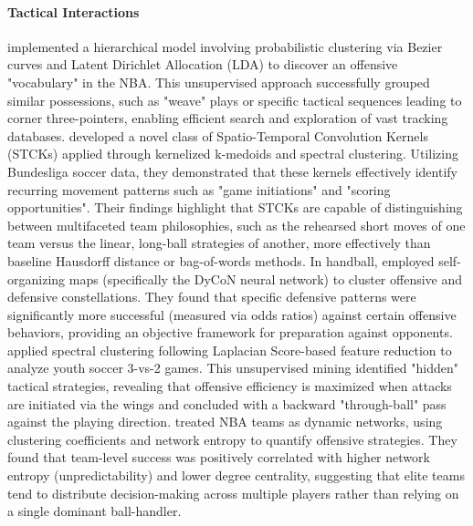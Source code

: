 \paragraph{Tactical Interactions}
\cite{Miller2017possession} implemented a hierarchical model involving probabilistic clustering via Bezier curves and Latent Dirichlet Allocation (LDA) to discover an offensive "vocabulary" in the NBA. 
This unsupervised approach successfully grouped similar possessions, such as "weave" plays or specific tactical sequences leading to corner three-pointers, enabling efficient search and exploration of vast tracking databases.
\cite{Knauf2015SpatiotemporalCK} developed a novel class of Spatio-Temporal Convolution Kernels (STCKs) applied through kernelized k-medoids and spectral clustering. 
Utilizing Bundesliga soccer data, they demonstrated that these kernels effectively identify recurring movement patterns such as "game initiations" and "scoring opportunities". 
Their findings highlight that STCKs are capable of distinguishing between multifaceted team philosophies, such as the rehearsed short moves of one team versus the linear, long-ball strategies of another, more effectively than baseline Hausdorff distance or bag-of-words methods.
In handball, \cite{Schrapf2017TacticalIO} employed self-organizing maps (specifically the DyCoN neural network) to cluster offensive and defensive constellations. 
They found that specific defensive patterns were significantly more successful (measured via odds ratios) against certain offensive behaviors, providing an objective framework for preparation against opponents.
\cite{Leser2019FindingES} applied spectral clustering following Laplacian Score-based feature reduction to analyze youth soccer 3-vs-2 games. 
This unsupervised mining identified "hidden" tactical strategies, revealing that offensive efficiency is maximized when attacks are initiated via the wings and concluded with a backward "through-ball" pass against the playing direction.
\cite{Fewell2012basketball} treated NBA teams as dynamic networks, using clustering coefficients and network entropy to quantify offensive strategies. 
They found that team-level success was positively correlated with higher network entropy (unpredictability) and lower degree centrality, suggesting that elite teams tend to distribute decision-making across multiple players rather than relying on a single dominant ball-handler.


